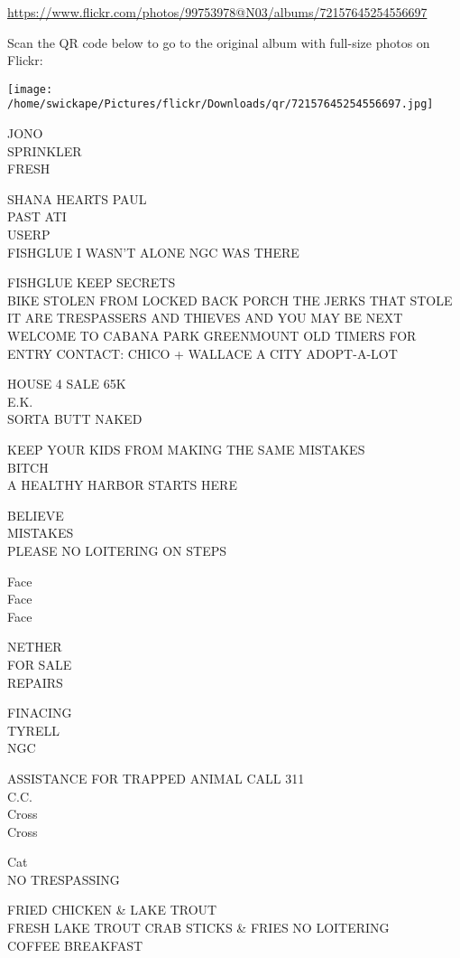 \documentclass[10pt,letterpaper]{article}
\begin{document}
\url{https://www.flickr.com/photos/99753978@N03/albums/72157645254556697}

Scan the QR code below to go to the original album with full-size photos on Flickr:

\texttt{[image: /home/swickape/Pictures/flickr/Downloads/qr/72157645254556697.jpg]}


JONO\\
SPRINKLER\\
FRESH

SHANA HEARTS PAUL\\
PAST ATI\\
USERP\\
FISHGLUE I WASN'T ALONE NGC WAS THERE

FISHGLUE KEEP SECRETS\\
BIKE STOLEN FROM LOCKED BACK PORCH THE JERKS THAT STOLE IT ARE TRESPASSERS AND THIEVES AND YOU MAY BE NEXT\\
WELCOME TO CABANA PARK GREENMOUNT OLD TIMERS FOR ENTRY CONTACT: CHICO + WALLACE A CITY ADOPT{-}A{-}LOT

HOUSE 4 SALE 65K\\
E.K.\\
SORTA BUTT NAKED

KEEP YOUR KIDS FROM MAKING THE SAME MISTAKES\\
BITCH\\
A HEALTHY HARBOR STARTS HERE

BELIEVE\\
MISTAKES\\
PLEASE NO LOITERING ON STEPS

Face\\
Face\\
Face

NETHER\\
FOR SALE\\
REPAIRS

FINACING\\
TYRELL\\
NGC

ASSISTANCE FOR TRAPPED ANIMAL CALL 311\\
C.C.\\
Cross\\
Cross

Cat\\
NO TRESPASSING

FRIED CHICKEN \& LAKE TROUT\\
FRESH LAKE TROUT CRAB STICKS \& FRIES NO LOITERING\\
COFFEE BREAKFAST
\end{document}
